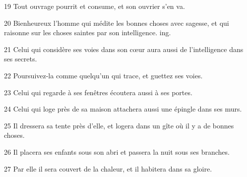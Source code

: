 \par 19 Tout ouvrage pourrit et consume, et son ouvrier s'en va.
\par 20 Bienheureux l'homme qui médite les bonnes choses avec sagesse, et qui raisonne sur les choses saintes par son intelligence. ing.
\par 21 Celui qui considère ses voies dans son cœur aura aussi de l'intelligence dans ses secrets.
\par 22 Poursuivez-la comme quelqu'un qui trace, et guettez ses voies.
\par 23 Celui qui regarde à ses fenêtres écoutera aussi à ses portes.
\par 24 Celui qui loge près de sa maison attachera aussi une épingle dans ses murs.
\par 25 Il dressera sa tente près d'elle, et logera dans un gîte où il y a de bonnes choses.
\par 26 Il placera ses enfants sous son abri et passera la nuit sous ses branches.
\par 27 Par elle il sera couvert de la chaleur, et il habitera dans sa gloire.


